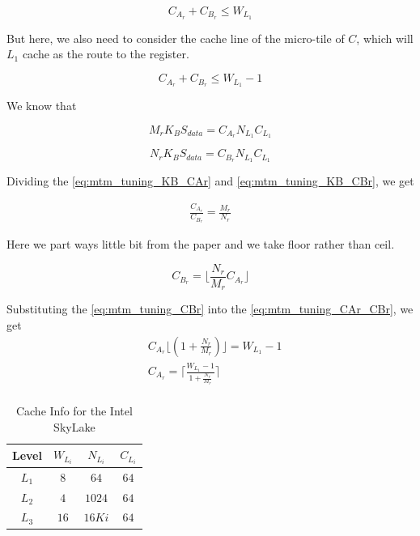 \[C_{A_r} + C_{B_r} \leq W_{L_1}\]

But here, we also need to consider the cache line of the micro-tile of $C$, which will $L_1$
cache as the route to the register.

\begin{equation}
    C_{A_r} + C_{B_r} \leq W_{L_1} - 1
    \label{eq:mtm_tuning_CAr_CBr}
\end{equation}

We know that

\begin{equation}
    M_r K_B S_{data} = C_{A_r} N_{L_1} C_{L_1}
    \label{eq:mtm_tuning_KB_CAr}
\end{equation}

\begin{equation}
    N_r K_B S_{data} = C_{B_r} N_{L_1} C_{L_1}
    \label{eq:mtm_tuning_KB_CBr}
\end{equation}

Dividing the \ref{eq:mtm_tuning_KB_CAr} and \ref{eq:mtm_tuning_KB_CBr}, we get

\begin{align*}
    \frac{C_{A_r}}{C_{B_r}} = \frac{M_r}{N_r}
\end{align*}

Here we part ways little bit from the paper and we take floor rather than ceil.

\begin{equation}
    C_{B_r} = \lfloor \frac{N_r}{M_r} C_{A_r} \rfloor
    \label{eq:mtm_tuning_CBr}
\end{equation}

Substituting the \ref{eq:mtm_tuning_CBr} into the \ref{eq:mtm_tuning_CAr_CBr}, we get
\begin{align*}
    &C_{A_r} \lfloor ( 1 + \frac{N_r}{M_r} ) \rfloor = W_{L_1} - 1\\
    &C_{A_r} = \lceil \frac{W_{L_1} - 1}{1 + \frac{N_r}{M_r}} \rceil\\
\end{align*}

\begin{table}[ht]
    \centering
    \caption{Cache Info for the Intel SkyLake}
    \begin{tabular}{|c|c|c|c|}
        \hline
        \textbf{Level} & \textbf{$W_{L_i}$} & \textbf{$N_{L_i}$} & \textbf{$C_{L_i}$}\\
        \hline
        $L_1$   & $8$ & $64$ & $64$ \\
        \hline
        $L_2$   & $4$ & $1024$ & $64$ \\
        \hline
        $L_3$   & $16$ & $16Ki$ & $64$ \\
        \hline
    \end{tabular}
\end{table}

